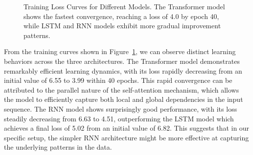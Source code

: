 \documentclass[12pt,oneside]{article}
\begin{document}
\begin{figure}[!htb]
    \centering
    \caption{Training Loss Curves for Different Models. The Transformer model shows the fastest convergence, reaching a loss of 4.0 by epoch 40, while LSTM and RNN models exhibit more gradual improvement patterns.}
    \label{fig:training_loss}
\end{figure}

From the training curves shown in Figure~\ref{fig:training_loss}, we can observe distinct learning behaviors across the three architectures. The Transformer model demonstrates remarkably efficient learning dynamics, with its loss rapidly decreasing from an initial value of 6.55 to 3.99 within 40 epochs. This rapid convergence can be attributed to the parallel nature of the self-attention mechanism, which allows the model to efficiently capture both local and global dependencies in the input sequence. The RNN model shows surprisingly good performance, with its loss steadily decreasing from 6.63 to 4.51, outperforming the LSTM model which achieves a final loss of 5.02 from an initial value of 6.82. This suggests that in our specific setup, the simpler RNN architecture might be more effective at capturing the underlying patterns in the data.
\end{document}

